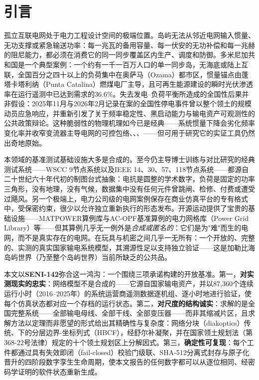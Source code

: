\section{引言}
\label{sec:intro}

孤立互联电网处于电力工程设计空间的极端位置。岛屿无法从邻近电网输入惯量、无功支撑或紧急输送功率：每一兆瓦的备用容量、每一伏安的无功补偿和每一兆赫的阻尼能力，都必须在消费它的同一同步覆盖区内生产、调度和防御。多米尼加共和国是一个典型案例：一个约有一千一百万人口的单一同步岛，无海底或陆上互联，全国百分之四十以上的负荷集中在奥萨马（Ozama）都市区，惯量锚点由蓬塔卡塔利纳（Punta Catalina）燃煤电厂主导，且可再生能源建设的瞬时光伏渗透率在运行遥测中已达到需求的36.6\%\cite{ocseni}。失去发电--负荷平衡所造成的全国性后果并非假设：2025年11月与2026年2月记录在案的全国性停电事件\cite{ocseni}曾以整个领土的规模动员应急响应，并重新引发了关于频率稳定性、黑启动能力与输电资产可观测性的公共政策辩论\cite{blackout2004}。这种脆弱性的物理机理如今已是经典\cite{kundur1994}——系统惯量下降会劣化频率变化率并收窄变流器主导电网的可控包络\cite{tielens2016}、\cite{milano2018}、\cite{dorfler2013}、\cite{hatziargyriou2021}——但可用于研究它的实证工具仍然出奇地原始。

本领域的基准测试基础设施大多是合成的。至今仍主导博士训练与对比研究的经典测试系统——WSCC 9节点系统以及IEEE 14、30、57、118节点系统——都源自二十世纪六十年代初的制图台式抽象：电抗是圆整的学术数字，负荷是固定的功率三角形，没有地理，没有气候，数据集中没有任何元件曾跳闸、检修、付费或遭受过飓风。另一个极端上，电力公司级的电网案例保存在商业仿真平台的专有格式中，受保密约束，很少以允许独立重新执行的形态发布。开源运动提供了宝贵的基础设施——MATPOWER算例库\cite{matpower2011}与AC-OPF基准算例的电力网格库（Power Grid Library）\cite{pglib2019}等——但其算例几乎无一例外是\emph{合成或匿名的}：它们是为"难"而生的电网，而不是真实存在的电网。在玩具与机密之间几乎一无所有：一个开放的、完整的、实测的真实国家输电系统模型，其溯源性足以支持独立验证——这是加勒比海岛屿世界（乃至整个岛屿世界）当前所缺乏的公共品。

本文以\textbf{SENI-142}弥合这一鸿沟：一个围绕三项承诺构建的开放基准。第一，\textbf{对实测现实的忠实}：网络模型不是合成的——它源自国家输电资产，并以87,360个连续运行小时（2016--2025年）的系统运营商遥测数据逐机组、逐小时地进行验证，使每个仿真状态都对应一个存档的运行状态。第二，\textbf{对尺度的结构诚实}：求解的是全国完整系统——全部输电母线、全部干线、全部变压器——而非其缩减片区，且求解方法以定理而非愿望的形式给出其精确性与复杂度：网络分块（diakoptics）传统\cite{kron1963}、\cite{happ1971}下的分层边界-坐标列式（HBCF），经舒尔补\cite{zhang2005}凝聚，并在国家领土规划法（第368-22号法律）\cite{ley368}规定的十个领土规划区上分解因式。第三，\textbf{确定性可复现}：每个工件都通过具有失效即闭（fail-closed）校验门级联、SHA-512分离式封存与原子化晋升的四阶段数字孪生生命周期，使本文报告的任何数字都可以从逐位相同、经密码学证明的软件状态重新生成。

